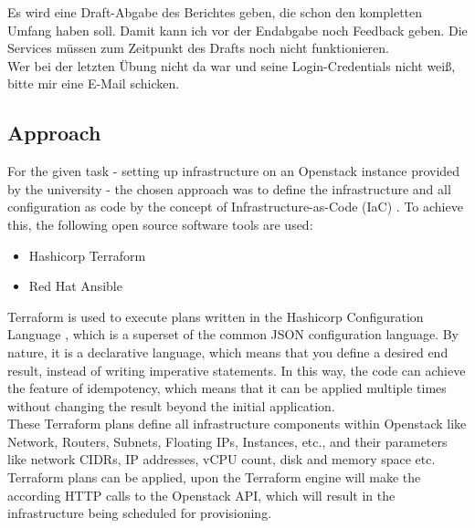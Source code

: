 \noindent
Es wird eine Draft-Abgabe des Berichtes geben, die schon den kompletten Umfang
haben soll. Damit kann ich vor der Endabgabe noch Feedback geben. Die Services
müssen zum Zeitpunkt des Drafts noch nicht funktionieren. \\

\noindent
Wer bei der letzten Übung nicht da war und seine Login-Credentials nicht
weiß, bitte mir eine E-Mail schicken. \\

\subsection{Approach}

For the given task - setting up infrastructure on 
an Openstack \cite{openstackWebsite} instance provided by the university -
the chosen approach was to define the infrastructure and all configuration
as code by the concept of Infrastructure-as-Code (IaC) \cite{iacDefinitionIBM}.
To achieve this, the following open source software tools are used:

\begin{itemize}
	\item Hashicorp Terraform \cite{terraformWebsite}
	\item Red Hat Ansible \cite{ansibleWebsite}
\end{itemize}

\noindent
Terraform is used to execute plans written in the 
Hashicorp Configuration Language \cite{hclWebsite},
which is a superset of the common JSON configuration language.
By nature, it is a declarative language, which means that
you define a desired end result, instead of writing imperative statements.
In this way, the code can achieve the feature of idempotency,
which means that it can be applied multiple times without 
changing the result beyond the initial application. \\

\noindent
These Terraform plans define all infrastructure components
within Openstack like Network, Routers, Subnets, Floating IPs, Instances, etc.,
and their parameters like network CIDRs, IP addresses, vCPU count, disk and memory space etc. \\

\noindent
Terraform plans can be applied, upon the Terraform engine will make
the according HTTP calls to the Openstack API, which will result in the infrastructure
being scheduled for provisioning. \\

